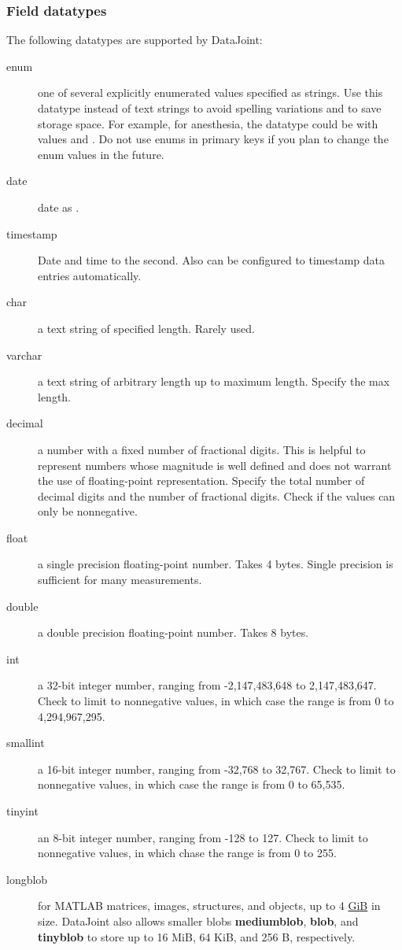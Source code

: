 \documentclass[10pt]{article}
\begin{document}
\subsubsection{Field datatypes}\label{sec:datatypes}
The following datatypes are supported by DataJoint:
\begin{description}
\item[enum] one of several explicitly enumerated values specified as strings. Use this datatype instead of text strings to avoid spelling variations and to save storage space.  For example, for anesthesia, the datatype could be  with values  and .  Do not use enums in primary keys if you plan to change the enum values in the future.
\item[date] date as .
\item[timestamp]  Date and time to the second.  Also can be configured to timestamp data entries automatically.
\item[char]  a text string of specified length. Rarely used.
\item[varchar]  a text string of arbitrary length up to maximum length. Specify the max length. 
\item[decimal]  a number with a fixed number of fractional digits.  This is helpful to represent numbers whose magnitude is well defined and does not warrant the use of floating-point representation.  Specify the total number of decimal digits and the number of fractional digits.  Check  if the values can only be nonnegative.
\item[float]  a single precision floating-point number.  Takes 4 bytes.  Single precision is sufficient for many measurements.
\item[double]  a double precision floating-point number. Takes 8 bytes.  
\item[int] a 32-bit integer number, ranging from -2,147,483,648 to 2,147,483,647.  Check  to limit to nonnegative values, in which case the range is from 0 to 4,294,967,295.
\item[smallint] a 16-bit integer number, ranging from -32,768 to 32,767.  Check  to limit to nonnegative values, in which case the range is from 0 to 65,535.
\item[tinyint] an 8-bit integer number, ranging from -128 to 127.   Check  to limit to nonnegative values, in which chase the range is from 0 to 255.
\item[longblob] for MATLAB matrices, images, structures, and objects, up to 4 \href{http://en.wikipedia.org/wiki/Gibibyte}{GiB} in size.  DataJoint also allows smaller blobs 
{\bf mediumblob}, {\bf blob}, and {\bf tinyblob} to store up to 16 MiB, 64 KiB, and 256 B, respectively. 
\end{description}
\end{document}
